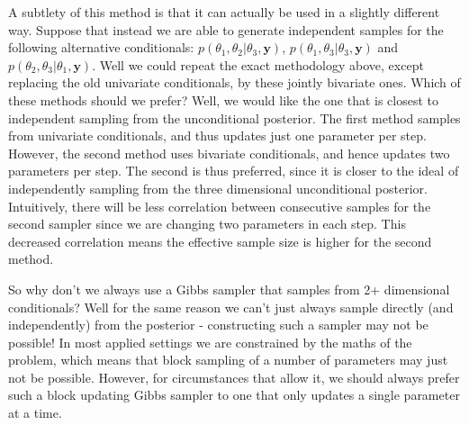 \documentclass[11pt,fullpage]{book}
\begin{document}
A subtlety of this method is that it can actually be used in a slightly different way. Suppose that instead we are able to generate independent samples for the following alternative conditionals: $p(\theta_1,\theta_2|\theta_3,\boldsymbol{y})$, $p(\theta_1,\theta_3|\theta_3,\boldsymbol{y})$ and $p(\theta_2,\theta_3|\theta_1,\boldsymbol{y})$. Well we could repeat the exact methodology above, except replacing the old univariate conditionals, by these jointly bivariate ones. Which of these methods should we prefer? Well, we would like the one that is closest to independent sampling from the unconditional posterior. The first method samples from univariate conditionals, and thus updates just one parameter per step. However, the second method uses bivariate conditionals, and hence updates two parameters per step. The second is thus preferred, since it is closer to the ideal of independently sampling from the three dimensional unconditional posterior. Intuitively, there will be less correlation between consecutive samples for the second sampler since we are changing two parameters in each step. This decreased correlation means the effective sample size is higher for the second method.

So why don't we always use a Gibbs sampler that samples from 2+ dimensional conditionals? Well for the same reason we can't just always sample directly (and independently) from the posterior - constructing such a sampler may not be possible! In most applied settings we are constrained by the maths of the problem, which means that block sampling of a number of parameters may just not be possible. However, for circumstances that allow it, we should always prefer such a block updating Gibbs sampler to one that only updates a single parameter at a time.
\end{document}
